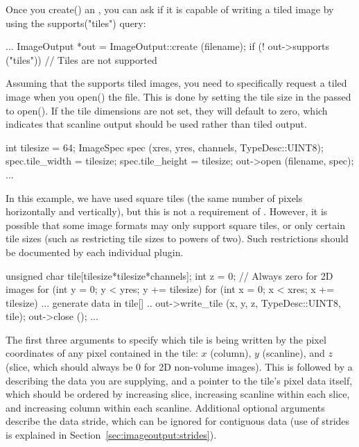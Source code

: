 Once you {\kw create()} an \ImageOutput, you can ask if it is capable
of writing a tiled image by using the {\kw supports("tiles")} query:

\begin{code}
        ...
        ImageOutput *out = ImageOutput::create (filename);
        if (! out->supports ("tiles")) {
            // Tiles are not supported
        }
\end{code}

Assuming that the \ImageOutput supports tiled images, you need to
specifically request a tiled image when you {\kw open()} the file.  This
is done by setting the tile size in the \ImageSpec passed
to {\kw open()}.  If the tile dimensions are not set, they will default
to zero, which indicates that scanline output should be used rather than
tiled output.

\begin{code}
        int tilesize = 64;
        ImageSpec spec (xres, yres, channels, TypeDesc::UINT8);
        spec.tile_width = tilesize;
        spec.tile_height = tilesize;
        out->open (filename, spec);
        ...
\end{code}

In this example, we have used square tiles (the same number of pixels
horizontally and vertically), but this is not a requirement of \product.
However, it is possible that some image formats may only support square
tiles, or only certain tile sizes (such as restricting tile sizes to
powers of two).  Such restrictions should be documented by each
individual plugin.

\begin{code}
        unsigned char tile[tilesize*tilesize*channels];
        int z = 0;   // Always zero for 2D images
        for (int y = 0;  y < yres;  y += tilesize) {
            for (int x = 0;  x < xres;  x += tilesize) {
                ... generate data in tile[] ..
                out->write_tile (x, y, z, TypeDesc::UINT8, tile);
            }
        }
        out->close ();
        ...
\end{code}

The first three arguments to \writetile specify which tile is
being written by the pixel coordinates of any pixel contained in the
tile: $x$ (column), $y$ (scanline), and $z$ (slice, which should always
be 0 for 2D non-volume images).  This is followed by a \TypeDesc
describing the data you are supplying, and a pointer to the tile's pixel
data itself, which should be ordered by increasing slice, increasing
scanline within each slice, and increasing column within each scanline.
Additional optional arguments describe the data stride, which can be
ignored for contiguous data (use of strides is explained in
Section~\ref{sec:imageoutput:strides}).

